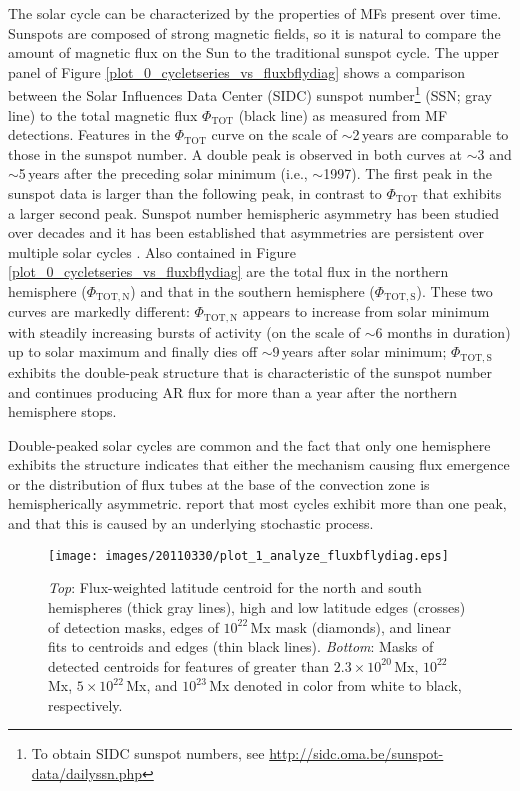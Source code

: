 \documentclass[namedreferences]{solarphysics}
\begin{document}
\begin{article}
The solar cycle can be characterized by the properties of MFs present over time. Sunspots are composed of strong magnetic fields, so it is natural to compare the amount of magnetic flux on the Sun to the traditional sunspot cycle. The upper panel of Figure \ref{plot_0_cycletseries_vs_fluxbflydiag} shows a comparison between the Solar Influences Data Center (SIDC) sunspot number\footnote{To obtain SIDC sunspot numbers, see \url{http://sidc.oma.be/sunspot-data/dailyssn.php}} (SSN; gray line) to the total magnetic flux $\Phi_{\mathrm{TOT}}$ (black line) as measured from MF detections. Features in the $\Phi_{\mathrm{TOT}}$ curve on the scale of $\sim$2\,years are comparable to those in the sunspot number. A double peak is observed in both curves at $\sim$3 and $\sim$5\,years after the preceding solar minimum (i.e., $\sim$1997). The first peak in the sunspot data is larger than the following peak, in contrast to $\Phi_{\mathrm{TOT}}$ that exhibits a larger second peak. Sunspot number hemispheric asymmetry has been studied over decades \citep{Li:2001a,Temmer:2002} and it has been established that asymmetries are persistent over multiple solar cycles \citep{Temmer:2006}. Also contained in Figure\,\ref{plot_0_cycletseries_vs_fluxbflydiag} are the total flux in the northern hemisphere ($\Phi_\mathrm{TOT,N}$) and that in the southern hemisphere ($\Phi_\mathrm{TOT,S}$). These two curves are markedly different: $\Phi_\mathrm{TOT,N}$ appears to increase from solar minimum with steadily increasing bursts of activity (on the scale of $\sim$6 months in duration) up to solar maximum and finally dies off $\sim$9\,years after solar minimum; $\Phi_\mathrm{TOT,S}$ exhibits the double-peak structure that is characteristic of the sunspot number and continues producing AR flux for more than a year after the northern hemisphere stops. 


Double-peaked solar cycles are common \citep{gnevyshev:1977} and the fact that only one hemisphere exhibits the structure indicates that either the mechanism causing flux emergence or the distribution of flux tubes at the base of the convection zone is hemispherically asymmetric. 
\citet{wang:2003a} report that most cycles exhibit more than one peak, and that this is caused by an underlying stochastic process.


\begin{figure*}[!t]
 \texttt{[image: images/20110330/plot\_1\_analyze\_fluxbflydiag.eps]}
\caption{\emph{Top}: Flux-weighted latitude centroid for the north and south hemispheres (thick gray lines), high and low latitude edges (crosses) of detection masks, edges of $10^{22}$\,Mx mask (diamonds), and linear fits to centroids and edges (thin black lines). \emph{Bottom}: Masks of detected centroids for features of greater than $2.3\times10^{20}$\,Mx, $10^{22}$\,Mx, $5\times10^{22}$\,Mx, and $10^{23}$\,Mx denoted in color from white to black, respectively.}\label{plot_1_analyze_fluxbflydiag}
\end{figure*}


\end{article}
\end{document}
